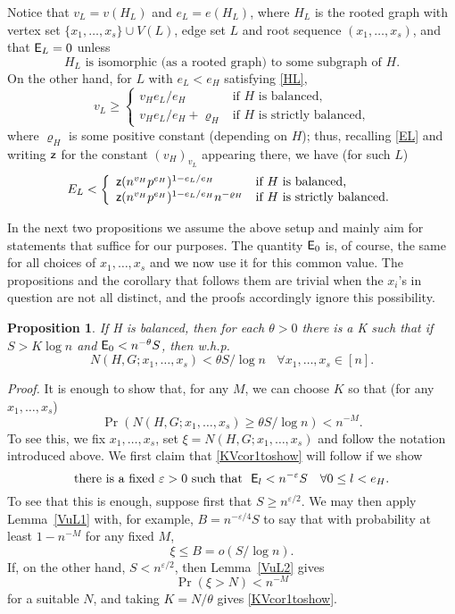 \documentclass[letterpaper,11pt]{article}
\newtheorem{prop}[thm]{Proposition}
\newcommand{\beq}[1]{\begin{equation}\label{#1}}
\newcommand{\enq}[0]{\end{equation}}
\newcommand{\nin}[0]{\noindent}
\renewcommand{\dots}[0]{,\ldots,}
\newcommand{\zz}[0]{\mbox{{\sf z}}}
\newcommand{\0}[0]{\emptyset}
\newcommand{\go}[0]{\omega}
\newcommand{\eps}[0]{\varepsilon }
\begin{document}
Notice that
$v_L=v(H_L)$ and $e_L=e(H_L)$, where $H_L$ is the rooted
graph with vertex set $\{x_1\dots x_s\}\cup V(L)$,
edge set $L$ and root sequence $(x_1\dots x_s)$,
and that
${\sf E}_L= 0$ unless
\beq{HL}
\mbox{$H_L$ is isomorphic (as a rooted graph)
to some subgraph of $H$.}
\enq
On the other hand, for $L$ with $e_L<e_H$ satisfying \eqref{HL},
\beq{vL}
v_L\geq \left\{\begin{array}{ll}
v_He_L/e_H &\mbox{if $H$ is balanced,}\\
v_He_L/e_H+\varrho_H &\mbox{if $H$ is strictly balanced,}
\end{array}\right.
\enq
where $\varrho_H$ is some positive constant (depending on $H$);
thus, recalling \eqref{EL} and
writing $\zz$ for the constant $(v_H)_{v_L}$ appearing there,
we have (for such $L$)
%
\beq{EL''}
E_L <
\left\{\begin{array}{ll}
\zz (n^{v_H}p^{e_H})^{1-e_L/e_H}&\mbox{if $H$ is balanced,}\\
\zz (n^{v_H}p^{e_H})^{1-e_L/e_H}n^{-\varrho{_H}}
&\mbox{if $H$ is strictly balanced.}
\end{array}\right.
\enq


\medskip
In the next two propositions we assume the above setup
and mainly aim for statements that suffice for our purposes.
The quantity ${\sf E}_0$ is, of course, the same
for all choices of $x_1\dots x_s$ and we now use it for
this common value.
The propositions and the corollary that follows them
are trivial when the $x_i$'s in question are not all distinct,
and the proofs accordingly ignore this possibility.

\begin{prop}\label{KVcor1}
If H is balanced, then for each $\theta>0$ there is a K
such that if $S>K\log n$ and
${\sf E}_0 < n^{-\theta}S$,
then w.h.p.
\[
N(H,G;x_1\dots x_s)
< \theta S/\log n   ~~~~\forall x_1\dots x_s\in [n].
\]
\end{prop}

\nin
{\em Proof.}
It is enough to show that, for any $M$, we can choose $K$
so that (for any $x_1\dots x_s$)
\beq{KVcor1toshow}
\Pr(N(H,G;x_1\dots x_s)
\geq  \theta S/\log n) < n^{-M}.
\enq
To see this, we fix $x_1\dots x_s$, set
$\xi=N(H,G;x_1\dots x_s)$ and follow the notation introduced above.
We first claim that \eqref{KVcor1toshow} will follow if we show
%
\beq{ETSeps}
\mbox{there is a fixed $\eps>0$ such that}
~~\E_{l} < n^{-\eps}S ~~~\forall 0\leq l< e_H .
\enq
%
To see that this is enough,
suppose first that $S\geq n^{\eps/2}$.
We may then apply Lemma~\ref{VuL1} with, for example,
$B = n^{-\eps/4}S$
to say that with probability at least $1-n^{-M}$
for any fixed $M$,
\[\xi \leq B =o(S/\log n).\]
If, on the other hand, $S< n^{\eps/2}$, then
Lemma~\ref{VuL2} gives
\[
\Pr(\xi >N) < n^{-M}
\]
for a suitable $N$, and taking $K=N/\theta$ gives
\eqref{KVcor1toshow}.
\end{document}

